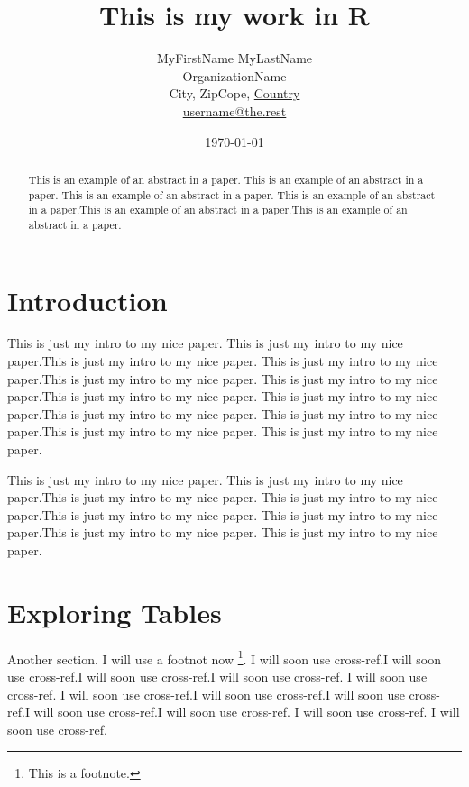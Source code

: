 \documentclass[a4paper, 12pt]{article}
\title{This is my work in R}
\author{ MyFirstName MyLastName\\OrganizationName\\
         City, ZipCope, \underline{Country}\\
        \url{username@the.rest}}
\date{\today}  %
\begin{document}

\maketitle 
\begin{abstract}
This is an example of an abstract in a paper. This is an example of an abstract in a paper. This is an example of an abstract in a paper. This is an example of an abstract in a paper.This is an example of an abstract in a paper.This is an example of an abstract in a paper.
\end{abstract}



\section*{Introduction} %

This is just my intro to my nice paper. This is just my intro to my nice paper.This is just my intro to my nice paper. This is just my intro to my nice paper.This is just my intro to my nice paper. This is just my intro to my nice paper.This is just my intro to my nice paper. This is just my intro to my nice paper.This is just my intro to my nice paper. This is just my intro to my nice paper.This is just my intro to my nice paper. This is just my intro to my nice paper.

This is just my intro to my nice paper. This is just my intro to my nice paper.This is just my intro to my nice paper. This is just my intro to my nice paper.This is just my intro to my nice paper. This is just my intro to my nice paper.This is just my intro to my nice paper. This is just my intro to my nice paper.


\section{Exploring Tables}\label{explo-tables} %

Another section. I will use a footnot now \footnote{This is a footnote.}. I will soon use cross-ref.I will soon use cross-ref.I will soon use cross-ref.I will soon use cross-ref. I will soon use cross-ref. I will soon use cross-ref.I will soon use cross-ref.I will soon use cross-ref.I will soon use cross-ref.I will soon use cross-ref. I will soon use cross-ref. I will soon use cross-ref.
\end{document}
